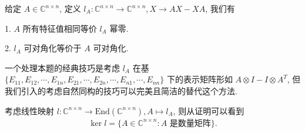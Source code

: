\documentclass[../../main.tex]{subfiles}%
\begin{document}
\begin{theorem}[Lie映射经典性质]\label{theorem:Lie映射经典性质}
给定 $A \in \mathbb{C}^{n \times n}$, 定义 $l_A: \mathbb{C}^{n \times n} \to \mathbb{C}^{n \times n}, X \to AX - XA$, 我们有

1. $A$ 所有特征值相同等价 $l_A$ 幂零.

2. $l_A$ 可对角化等价于 $A$ 可对角化.
\end{theorem}
\begin{note}
一个处理本题的经典技巧是考虑 $l_A$ 在基 $\{E_{11}, E_{12}, \cdots, E_{1n}, E_{21}, \cdots, E_{2n}, \cdots, E_{n1}, \cdots, E_{nn}\}$ 下的表示矩阵形如 $A \otimes I - I \otimes A^T$, 但我们引入的考虑自然同构的技巧可以完美且简洁的替代这个方法.
\end{note}
\begin{note}
考虑线性映射 $l: \mathbb{C}^{n \times n} \to \mathrm{End}(\mathbb{C}^{n \times n}), A \mapsto l_A$, 则从证明可以看到
\begin{align*}
\ker l = \{A \in \mathbb{C}^{n \times n} : A \text{ 是数量矩阵}\}.
\end{align*}
\end{note}
\end{document}
